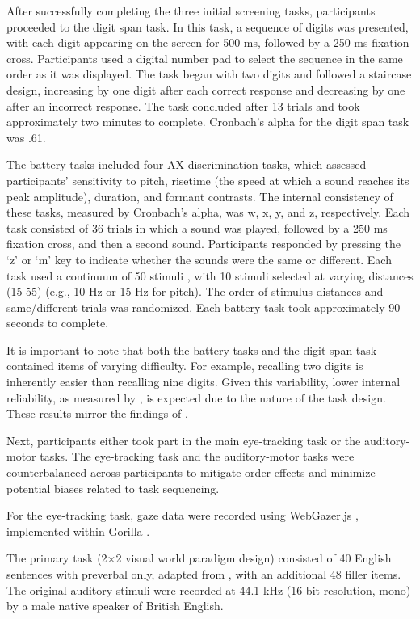 After successfully completing the three initial screening tasks, participants proceeded to the digit span task. In this task, a sequence of digits was presented, with each digit appearing on the screen for 500 ms, followed by a 250 ms fixation cross. Participants used a digital number pad to select the sequence in the same order as it was displayed. The task began with two digits and followed a staircase design, increasing by one digit after each correct response and decreasing by one after an incorrect response. The task concluded after 13 trials and took approximately two minutes to complete. Cronbach’s alpha for the digit span task was .61.

The battery tasks included four AX discrimination tasks, which assessed participants’ sensitivity to pitch, risetime (the speed at which a sound reaches its peak amplitude), duration, and formant contrasts. The internal consistency of these tasks, measured by Cronbach’s alpha, was w, x, y, and z, respectively. Each task consisted of 36 trials in which a sound was played, followed by a 250 ms fixation cross, and then a second sound. Participants responded by pressing the ‘z’ or ‘m’ key to indicate whether the sounds were the same or different. Each task used a continuum of 50 stimuli \citep{Kachlicka_Saito_Tierney_2019}, with 10 stimuli selected at varying distances (15-55) (e.g., 10 Hz or 15 Hz for pitch). The order of stimulus distances and same/different trials was randomized. Each battery task took approximately 90 seconds to complete.

It is important to note that both the battery tasks and the digit span task contained items of varying difficulty. For example, recalling two digits is inherently easier than recalling nine digits. Given this variability, lower internal reliability, as measured by \cite{Cronbach1951}, is expected due to the nature of the task design. These results mirror the findings of \cite{ppcc}.

Next, participants either took part in the main eye-tracking task or the auditory-motor tasks. The eye-tracking task and the auditory-motor tasks were counterbalanced across participants to mitigate order effects and minimize potential biases related to task sequencing.

For the eye-tracking task, gaze data were recorded using WebGazer.js \citep{Papoutsaki}, implemented within Gorilla \citep{Anwyl-Irvine_2019}. 

The primary task (2×2 visual world paradigm design) consisted of 40 English sentences with preverbal only, adapted from \cite{Ge_etal_2021}, with an additional 48 filler items. The original auditory stimuli were recorded at 44.1 kHz (16-bit resolution, mono) by a male native speaker of British English.

